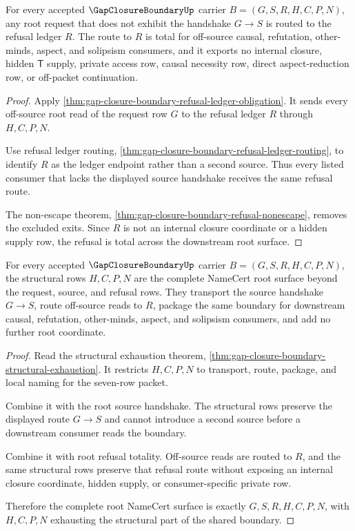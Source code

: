 \begin{theorem}
\label{thm:gap-closure-boundary-root-refusal-totality}
For every accepted $\GapClosureBoundaryUp$ carrier $B=(G,S,R,H,C,P,N)$, any root request that does not exhibit the handshake $G \longrightarrow S$ is routed to the refusal ledger $R$. The route to $R$ is total for off-source causal, refutation, other-minds, aspect, and solipsism consumers, and it exports no internal closure, hidden $\mathsf{T}$ supply, private access row, causal necessity row, direct aspect-reduction row, or off-packet continuation.
\end{theorem}
\begin{proof}
Apply \autoref{thm:gap-closure-boundary-refusal-ledger-obligation}. It sends every off-source root read of the request row $G$ to the refusal ledger $R$ through $H,C,P,N$.

Use refusal ledger routing, \autoref{thm:gap-closure-boundary-refusal-ledger-routing}, to identify $R$ as the ledger endpoint rather than a second source. Thus every listed consumer that lacks the displayed source handshake receives the same refusal route.

The non-escape theorem, \autoref{thm:gap-closure-boundary-refusal-nonescape}, removes the excluded exits. Since $R$ is not an internal closure coordinate or a hidden supply row, the refusal is total across the downstream root surface.
\end{proof}

\begin{theorem}
\label{thm:gap-closure-boundary-root-structural-exhaustion}
For every accepted $\GapClosureBoundaryUp$ carrier $B=(G,S,R,H,C,P,N)$, the structural rows $H,C,P,N$ are the complete NameCert root surface beyond the request, source, and refusal rows. They transport the source handshake $G \longrightarrow S$, route off-source reads to $R$, package the same boundary for downstream causal, refutation, other-minds, aspect, and solipsism consumers, and add no further root coordinate.
\end{theorem}
\begin{proof}
Read the structural exhaustion theorem, \autoref{thm:gap-closure-boundary-structural-exhaustion}. It restricts $H,C,P,N$ to transport, route, package, and local naming for the seven-row packet.

Combine it with the root source handshake. The structural rows preserve the displayed route $G \longrightarrow S$ and cannot introduce a second source before a downstream consumer reads the boundary.

Combine it with root refusal totality. Off-source reads are routed to $R$, and the same structural rows preserve that refusal route without exposing an internal closure coordinate, hidden supply, or consumer-specific private row.

Therefore the complete root NameCert surface is exactly $G,S,R,H,C,P,N$, with $H,C,P,N$ exhausting the structural part of the shared boundary.
\end{proof}

